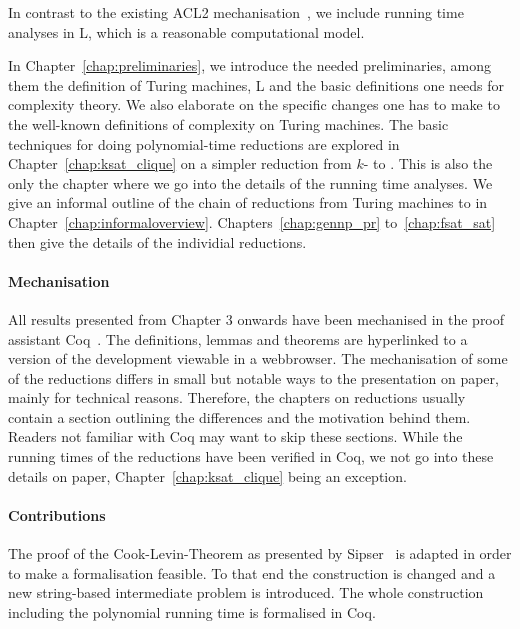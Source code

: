 In contrast to the existing ACL2 mechanisation~\cite{gamboa:cook}, we include running time analyses in L, which is a reasonable computational model.

In Chapter~\ref{chap:preliminaries}, we introduce the needed preliminaries, among them the definition of Turing machines, L and the basic definitions one needs for complexity theory. We also elaborate on the specific changes one has to make to the well-known definitions of complexity on Turing machines.
The basic techniques for doing polynomial-time reductions are explored in Chapter~\ref{chap:ksat_clique} on a simpler reduction from $k$-\SAT{} to \Clique{}. This is also the only the chapter where we go into the details of the running time analyses.
We give an informal outline of the chain of reductions from Turing machines to \SAT{} in Chapter~\ref{chap:informaloverview}. 
Chapters~\ref{chap:gennp_pr} to~\ref{chap:fsat_sat} then give the details of the individial reductions.

\paragraph{Mechanisation}
All results presented from Chapter 3 onwards have been mechanised in the proof assistant Coq~\cite{coqweb}. The definitions, lemmas and theorems are hyperlinked to a version of the development viewable in a webbrowser.
The mechanisation of some of the reductions differs in small but notable ways to the presentation on paper, mainly for technical reasons. 
Therefore, the chapters on reductions usually contain a section outlining the differences and the motivation behind them. 
Readers not familiar with Coq may want to skip these sections.
While the running times of the reductions have been verified in Coq, we not go into these details on paper, Chapter~\ref{chap:ksat_clique} being an exception.

\paragraph{Contributions}
The proof of the Cook-Levin-Theorem as presented by Sipser~\cite{Sipser:TheoryofComputation} is adapted in order to make a formalisation feasible. To that end the construction is changed and a new string-based intermediate problem is introduced. 
The whole construction including the polynomial running time is formalised in Coq.





